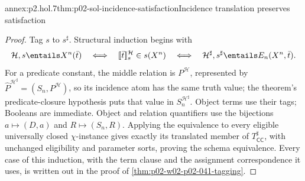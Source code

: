 \begin{annexitem}{annex:p2.hol.7}{thm:p02-sol-incidence-satisfaction}{Incidence translation preserves satisfaction}
\begin{proof}
Tag \(s\) to \(s^\sharp\).  Structural induction begins with
\[
 \mathcal H,s\entails X^n(\bar t)
 \quad\Longleftrightarrow\quad
 \lbrack\!\lbrack\bar t\rbrack\!\rbrack_s^{\mathcal H}\in s(X^n)
 \quad\Longleftrightarrow\quad
 \mathcal H^\sharp,s^\sharp\entails E_n(X^n,\bar t).
\]
For a predicate constant, the middle relation is
\(P^{\mathcal H}\), represented by
\(\widehat P^{\mathcal H^\sharp}=(S_n,P^{\mathcal H})\), so its incidence
atom has the same truth value; the theorem's predicate-closure hypothesis puts
that value in \(S_n^{\mathcal H^\sharp}\).  Object terms use their tags; Booleans are
immediate.  Object and relation quantifiers use the bijections
\(a\mapsto(D,a)\) and \(R\mapsto(S_n,R)\).  Applying the equivalence to every
eligible universally closed \(\chi\)-instance gives exactly its translated
member of \(T_{\mathsf{CC}}^\sharp\), with unchanged eligibility and parameter
sorts, proving the schema equivalence.  Every case of this induction, with
the term clause and the assignment correspondence it uses, is written out in
the proof of \cref{thm:p02-w02-p02-041-tagging}.
\end{proof}
\end{annexitem}

